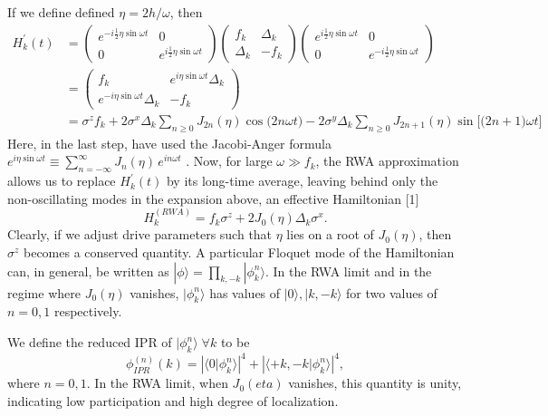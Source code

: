 \documentclass{article}
\begin{document}
If we define defined $\eta=2h/\omega$, then
\begin{align*}
H^\prime_k(t) &= \begin{pmatrix}e^{-i\frac12\eta\sin{\omega t}}&0\\0&e^{i\frac12\eta\sin{\omega t}}\end{pmatrix} \begin{pmatrix}f_k&\Delta_k\\\Delta_k &-f_k\end{pmatrix}\begin{pmatrix}e^{i\frac12\eta\sin{\omega t}}&0\\0&e^{-i\frac12\eta\sin{\omega t}}\end{pmatrix}\\
&= \begin{pmatrix}f_k&e^{i\eta\sin{\omega t}}\Delta_k\\e^{-i\eta\sin{\omega t}}\Delta_k&-f_k\end{pmatrix}\\
&=  \sigma^z f_k + 2\sigma^x \Delta_k \sum_{n\geq 0} J_{2n}(\eta)\cos{\big(2n\omega t\big)} - 2\sigma^y\Delta_k \sum_{n\geq 0} J_{2n+1}(\eta)\sin{\bigg[\big(2n+1\big)\omega t\bigg]}
\end{align*}
Here, in the last step, have used the Jacobi-Anger formula $e^{i \eta \sin{\omega t}} \equiv \sum_{n=-\infty}^{\infty} J_n(\eta)\, e^{i n \omega t}$ \cite{Miao}. Now, for large $\omega \gg f_k$, the RWA approximation allows us to replace $H^\prime_k(t)$ by its long-time average, leaving behind only the non-oscillating modes in the expansion above, an effective Hamiltonian [1]
\begin{equation*}
H^{(RWA)}_k=f_k \sigma^z + 2 J_0(\eta)\Delta_k\sigma^x.
\end{equation*}
Clearly, if we adjust drive parameters such that $\eta$ lies on a root of $J_0(\eta)$, then $\sigma^z$ becomes a conserved quantity. A particular Floquet mode of the Hamiltonian can, in general, be written as $|\phi\rangle = \prod_{k,-k}|\phi^n_k\rangle$. In the RWA limit and in the regime where $J_0(\eta)$ vanishes, $|\phi^n_k\rangle$ has values of $|0\rangle, |k,-k\rangle$ for two values of $n=0,1$ respectively.

We define the reduced IPR of $|\phi^n_k\rangle\; \forall k$ to be
\begin{equation*}
\phi^{(n)}_{IPR}(k) = \left\vert \langle 0 |\phi^n_k\rangle  \right\vert^4 + \left\vert \langle +k, -k |\phi^n_k\rangle  \right\vert^4,
\end{equation*}
where $n=0,1$. In the RWA limit, when $J_0(eta)$ vanishes, this quantity is unity, indicating low participation and high degree of localization.
\end{document}
